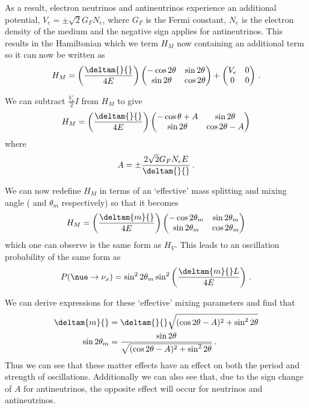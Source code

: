 As a result, electron neutrinos and antineutrinos experience an additional potential, $V_{e} = \pm \sqrt{2} G_{F} N_{e}$, where $G_{F}$ is the Fermi constant, $N_{e}$ is the electron density of the medium and the negative sign applies for antineutrinos.
This results in the Hamiltonian which we term $H_{M}$ now containing an additional term so it can now be written as
\begin{equation}
  H_{M} =  \left( \frac{\deltam{}{}}{4E} \right)
  \begin{pmatrix}
    -\cos 2\theta & \sin 2\theta \\
    \sin 2\theta & \cos 2\theta
  \end{pmatrix}
  +
  \begin{pmatrix}
    V_{e} & 0 \\
    0 & 0
  \end{pmatrix} \, .
\end{equation}

We can subtract $\frac{V_{e}}{2} I$ from $H_{M}$ to give
\begin{equation}
  H_{M} = \left( \frac{\deltam{}{}}{4E} \right)
  \begin{pmatrix}
    -\cos\theta+A & \sin 2\theta \\
    \sin 2\theta & \cos 2\theta - A 
  \end{pmatrix}
\end{equation}
where
\begin{equation}
  A = \pm \frac{ 2\sqrt{2}G_{F}N_{e}E }{\deltam{}{}} \, .
\end{equation}

We can now redefine $H_{M}$ in terms of an `effective' mass splitting and mixing angle ( and $\theta_{m}$ respectively) so that it becomes
\begin{equation}
  H_{M} = \left( \frac{\deltam{m}{}}{4E} \right)
  \begin{pmatrix}
    -\cos 2\theta_{m} & \sin 2\theta_{m} \\
    \sin 2\theta_{m} & \cos 2\theta_{m}
  \end{pmatrix}
\end{equation}
which one can observe is the same form as $H_{V}$.
This leads to an oscillation probability of the same form as 
\begin{equation}
  P(\nue \rightarrow \nu_{x}) = \sin^{2} 2\theta_{m} \sin^{2} \left( \frac{\deltam{m}{} L}{4E} \right) \, .
\end{equation}

We can derive expressions for these `effective' mixing parameters and find that
\begin{align}
  \deltam{m}{} &= \deltam{}{} \sqrt{ (\cos 2\theta - A)^{2} + \sin^{2} 2\theta }  \label{eq:mswMass} \\
  \sin 2\theta_{m} &= \frac{\sin 2\theta}{\sqrt{ (\cos 2\theta - A)^{2} + \sin^{2} 2\theta }} \,. \label{eq:mswAngle}
\end{align}
Thus we can see that these matter effects have an effect on both the period and strength of oscillations.
Additionally we can also see that, due to the sign change of $A$ for antineutrinos, the opposite effect will occur for neutrinos and antineutrinos. 

